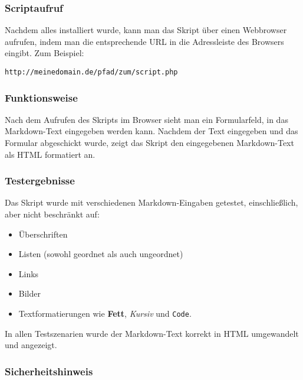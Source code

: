 \documentclass[12pt,a4paper]{scrartcl}
\newcommand{\tightlist}{
  \setlength{\itemsep}{0pt}\setlength{\parskip}{0pt}
}
\begin{document}
\hypertarget{scriptaufruf}{%
\subsubsection{Scriptaufruf}\label{scriptaufruf}}

Nachdem alles installiert wurde, kann man das Skript über einen
Webbrowser aufrufen, indem man die entsprechende URL in die Adressleiste
des Browsers eingibt. Zum Beispiel:

\begin{lstlisting}
http://meinedomain.de/pfad/zum/script.php
\end{lstlisting}

\hypertarget{funktionsweise}{%
\subsubsection{Funktionsweise}\label{funktionsweise}}

Nach dem Aufrufen des Skripts im Browser sieht man ein Formularfeld, in
das Markdown-Text eingegeben werden kann. Nachdem der Text eingegeben
und das Formular abgeschickt wurde, zeigt das Skript den eingegebenen
Markdown-Text als HTML formatiert an.

\hypertarget{testergebnisse}{%
\subsubsection{Testergebnisse}\label{testergebnisse}}

Das Skript wurde mit verschiedenen Markdown-Eingaben getestet,
einschließlich, aber nicht beschränkt auf:

\begin{itemize}
\tightlist
\item
  Überschriften
\item
  Listen (sowohl geordnet als auch ungeordnet)
\item
  Links
\item
  Bilder
\item
  Textformatierungen wie \textbf{Fett}, \emph{Kursiv} und
  {\lstinline!Code!}.
\end{itemize}

In allen Testszenarien wurde der Markdown-Text korrekt in HTML
umgewandelt und angezeigt.

\hypertarget{sicherheitshinweis}{%
\subsubsection{Sicherheitshinweis}\label{sicherheitshinweis}}
\end{document}
